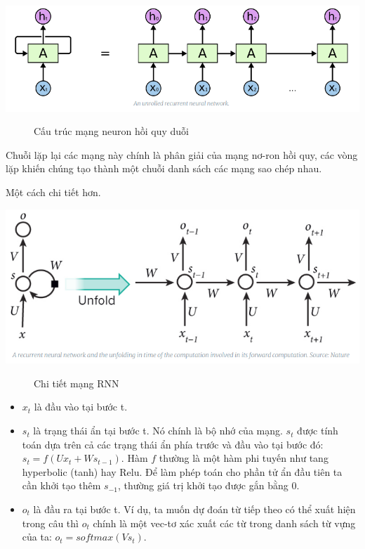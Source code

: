 \begin{center}
    \includegraphics[scale=.5]{image/chapter6/RNN-ab.png}
    \begin{figure}[htp]
    \begin{center}
    \end{center}
    \caption{Cấu trúc mạng neuron hồi quy duỗi}
    \end{figure}
\end{center}
Chuỗi lặp lại các mạng này chính là phân giải của mạng nơ-ron hồi quy, các vòng lặp khiến chúng tạo thành một chuỗi danh sách các mạng sao chép nhau.

Một cách chi tiết hơn. 
\begin{center}
    \includegraphics[scale=.4]{image/chapter6/rnn-detail.png}
    \begin{figure}[htp]
    \begin{center}
     
    \end{center}
    \caption{Chi tiết mạng RNN}
    \end{figure}
\end{center}
\begin{itemize}
    \item $x_{t}$ là đầu vào tại bước t.
    \item $s_{t}$ là trạng thái ẩn tại bước t. Nó chính là bộ nhớ của mạng. $s_{t}$ được tính toán dựa trên cả các trạng thái ẩn phía trước và đầu vào tại bước đó: $s_{t} = f(Ux_{t}+Ws_{t-1})$. Hàm $f$ thường là một hàm phi tuyến như tang hyperbolic (tanh) hay Relu. Để làm phép toán cho phần tử ẩn đầu tiên ta cần khởi tạo thêm $s_{-1}$, thường giá trị khởi tạo được gắn bằng 0.
    \item $o_{t}$ là đầu ra tại bước t. Ví dụ, ta muốn dự đoán từ tiếp theo có thể xuất hiện trong câu thì $o_{t}$ chính là một vec-tơ xác xuất các từ trong danh sách từ vựng của ta: $o_{t} = softmax(Vs_{t})$. 
\end{itemize}


